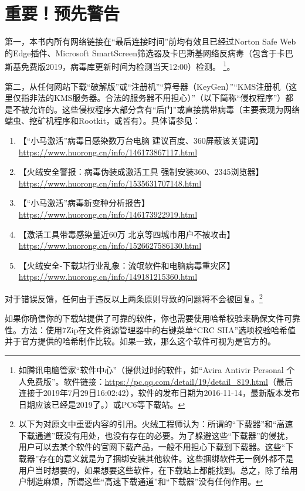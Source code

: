 \section{重要！预先警告}
第一，本书内所有网络链接在“最后连接时间”前均有效且已经过Norton Safe Web的Edge插件、Microsoft SmartScreen筛选器及卡巴斯基网络反病毒（包含于卡巴斯基免费版2019，病毒库更新时间为检测当天12:00）检测。 {\color{red}{注意，至少我坚持认为本书中提到的所有应用程序都应该从其官方网站或镜像源处下载。我们不推荐本书的使用者从任何非官方软件发布处下载任何本书中提到的软件（官方认可的镜像源除外）。}}\footnote{如腾讯电脑管家“软件中心”（提供过时的软件，如“Avira Antivir Personal 个人免费版”。软件链接：\url{https://pc.qq.com/detail/19/detail_819.html}（最后连接于2019年7月29日16:02:42），软件的发布日期为2016-11-14，最新版本发布日期应该已经是2019了。）或PC6等下载站。}。\par 
第二，从任何网站下载“破解版”或“注册机”“算号器（KeyGen）”“KMS注册机（这里仅指非法的KMS服务器。合法的服务器不用担心）”（以下简称“侵权程序”）都是不被允许的。这些侵权程序大部分含有“后门”或直接携带病毒（主要表现为网络蠕虫、挖矿机程序和Rootkit，或皆有）。具体请参见：
\begin{enumerate}
	\item 【“小马激活”病毒日感染数万台电脑 建议百度、360屏蔽该关键词】\url{https://www.huorong.cn/info/146173867117.html}
	\item 【火绒安全警报：病毒伪装成激活工具  强制安装360、2345浏览器】\url{https://www.huorong.cn/info/1535631707148.html}
	\item 【“小马激活”病毒新变种分析报告】\url{https://www.huorong.cn/info/146173922919.html}
	\item 【激活工具带毒感染量近60万 北京等四城市用户不被攻击】\url{https://www.huorong.cn/info/1526627586130.html}
	\item 【火绒安全-下载站行业乱象：流氓软件和电脑病毒重灾区】\url{https://www.huorong.cn/info/149181215360.html}
\end{enumerate}\par
对于错误反馈，任何由于违反以上两条原则导致的问题将不会被回复。\footnote{以下为对原文中重要内容的引用。火绒工程师认为：所谓的“下载器”和“高速下载通道”既没有用处，也没有存在的必要。为了躲避这些“下载器”的侵扰，用户可以去某个软件的官网下载产品，一般不用担心下载到下载器。这些“下载器”存在的意义就是为了捆绑安装其他软件。这些捆绑软件无一例外都不是用户当时想要的，如果想要这些软件，在下载站上都能找到。总之，除了给用户制造麻烦，所谓这些“高速下载通道”和“下载器”没有任何作用。}\par 
如果你确信你的下载站提供了可靠的软件，你也需要使用哈希校验来确保文件可靠性。方法：使用7Zip在文件资源管理器中的右键菜单“CRC SHA”选项校验哈希值并于官方提供的哈希制作比较。如果一致，那么这个软件可视为是官方的。 \par
